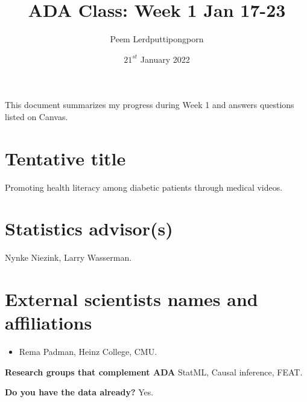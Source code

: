 \documentclass{article}
\title{ADA Class: Week 1 Jan 17-23}
\author{Peem Lerdputtipongporn}
\date{$21^{st}$ January 2022}
\begin{document}
\maketitle

This document summarizes my progress during Week 1 and answers questions
listed on Canvas.

\section{Tentative title} Promoting health literacy among diabetic patients
through medical videos.

\section{Statistics advisor(s)} Nynke Niezink, Larry Wasserman.

\section{External scientists names and affiliations}
\begin{itemize}
  \item Rema Padman, Heinz College, CMU.
\end{itemize}

\textbf{Research groups that complement ADA} StatML, Causal inference, FEAT.

\textbf{Do you have the data already?} Yes.
\end{document}
